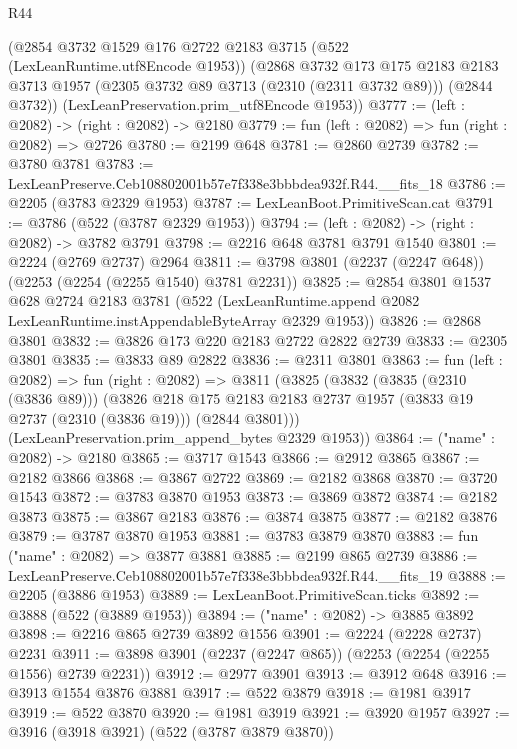 \begin{lexlean}{R44}
\begin{coremodule}
    (@2854
      @3732
      @1529
      @176
      @2722
      @2183
      @3715
      (@522 (LexLeanRuntime.utf8Encode @1953))
      (@2868
        @3732
        @173
        @175
        @2183
        @2183
        @3713
        @1957
        (@2305 @3732 @89 @3713 (@2310 (@2311 @3732 @89)))
        (@2844 @3732))
      (LexLeanPreservation.prim_utf8Encode @1953))
@3777 := (left : @2082) -> (right : @2082) -> @2180
@3779 := fun (left : @2082) => fun (right : @2082) => @2726
@3780 := @2199 @648
@3781 := @2860 @2739
@3782 := @3780 @3781
@3783 := LexLeanPreserve.Ceb108802001b57e7f338e3bbbdea932f.R44.__fits_18
@3786 := @2205 (@3783 @2329 @1953)
@3787 := LexLeanBoot.PrimitiveScan.cat
@3791 := @3786 (@522 (@3787 @2329 @1953))
@3794 := (left : @2082) -> (right : @2082) -> @3782 @3791
@3798 := @2216 @648 @3781 @3791 @1540
@3801 := @2224 (@2769 @2737) @2964
@3811 := @3798 @3801 (@2237 (@2247 @648)) (@2253 (@2254 (@2255 @1540) @3781 @2231))
@3825 := @2854
    @3801
    @1537
    @628
    @2724
    @2183
    @3781
    (@522 (LexLeanRuntime.append @2082 LexLeanRuntime.instAppendableByteArray @2329 @1953))
@3826 := @2868 @3801
@3832 := @3826 @173 @220 @2183 @2722 @2822 @2739
@3833 := @2305 @3801
@3835 := @3833 @89 @2822
@3836 := @2311 @3801
@3863 := fun (left : @2082) =>
  fun (right : @2082) =>
  @3811
    (@3825
      (@3832
        (@3835 (@2310 (@3836 @89)))
        (@3826
          @218
          @175
          @2183
          @2183
          @2737
          @1957
          (@3833 @19 @2737 (@2310 (@3836 @19)))
          (@2844 @3801)))
      (LexLeanPreservation.prim_append_bytes @2329 @1953))
@3864 := ("name" : @2082) -> @2180
@3865 := @3717 @1543
@3866 := @2912 @3865
@3867 := @2182 @3866
@3868 := @3867 @2722
@3869 := @2182 @3868
@3870 := @3720 @1543
@3872 := @3783 @3870 @1953
@3873 := @3869 @3872
@3874 := @2182 @3873
@3875 := @3867 @2183
@3876 := @3874 @3875
@3877 := @2182 @3876
@3879 := @3787 @3870 @1953
@3881 := @3783 @3879 @3870
@3883 := fun ("name" : @2082) => @3877 @3881
@3885 := @2199 @865 @2739
@3886 := LexLeanPreserve.Ceb108802001b57e7f338e3bbbdea932f.R44.__fits_19
@3888 := @2205 (@3886 @1953)
@3889 := LexLeanBoot.PrimitiveScan.ticks
@3892 := @3888 (@522 (@3889 @1953))
@3894 := ("name" : @2082) -> @3885 @3892
@3898 := @2216 @865 @2739 @3892 @1556
@3901 := @2224 (@2228 @2737) @2231
@3911 := @3898 @3901 (@2237 (@2247 @865)) (@2253 (@2254 (@2255 @1556) @2739 @2231))
@3912 := @2977 @3901
@3913 := @3912 @648
@3916 := @3913 @1554 @3876 @3881
@3917 := @522 @3879
@3918 := @1981 @3917
@3919 := @522 @3870
@3920 := @1981 @3919
@3921 := @3920 @1957
@3927 := @3916 (@3918 @3921) (@522 (@3787 @3879 @3870))

\end{coremodule}
\end{lexlean}
